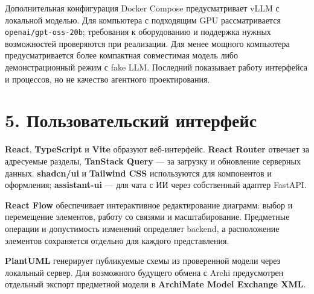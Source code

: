 \documentclass[11pt,a4paper]{article}
\begin{document}
Дополнительная конфигурация Docker Compose предусматривает vLLM с локальной моделью. Для компьютера с подходящим GPU рассматривается \texttt{openai/gpt-oss-20b}; требования к оборудованию и поддержка нужных возможностей проверяются при реализации. Для менее мощного компьютера предусматривается более компактная совместимая модель либо демонстрационный режим с fake LLM. Последний показывает работу интерфейса и процессов, но не качество агентного проектирования.

\clearpage

\section{5. Пользовательский интерфейс}\label{5-ux43fux43eux43bux44cux437ux43eux432ux430ux442ux435ux43bux44cux441ux43aux438ux439-ux438ux43dux442ux435ux440ux444ux435ux439ux441}

\textbf{React}, \textbf{TypeScript} и \textbf{Vite} образуют веб-интерфейс. \textbf{React Router} отвечает за адресуемые разделы, \textbf{TanStack Query} --- за загрузку и обновление серверных данных. \textbf{shadcn/ui} и \textbf{Tailwind CSS} используются для компонентов и оформления; \textbf{assistant-ui} --- для чата с ИИ через собственный адаптер FastAPI.

\textbf{React Flow} обеспечивает интерактивное редактирование диаграмм: выбор и перемещение элементов, работу со связями и масштабирование. Предметные операции и допустимость изменений определяет backend, а расположение элементов сохраняется отдельно для каждого представления.

\textbf{PlantUML} генерирует публикуемые схемы из проверенной модели через локальный сервер. Для возможного будущего обмена с Archi предусмотрен отдельный экспорт предметной модели в \textbf{ArchiMate Model Exchange XML}.
\end{document}
